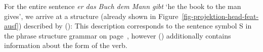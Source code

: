 \z


\noindent
For the entire sentence \emph{er das Buch dem Mann gibt} `he the book to the man gives', we arrive at a structure (already shown in Figure~\ref{fig-projektion-head-feat-ausf}) 
described by ():
\ea
\label{HPSG-Rootnode}
\z
This description corresponds to the sentence symbol S in the phrase structure grammar on page~\pageref{bsp-grammatik-psg},
however () additionally contains information about the form of the verb.

